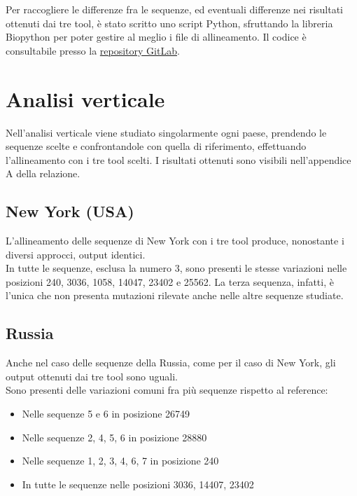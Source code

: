 \documentclass[a4paper,10pt]{article}
\begin{document}
Per raccogliere le differenze fra le sequenze, ed eventuali differenze nei risultati ottenuti dai tre tool, è stato scritto uno script Python, sfruttando la libreria Biopython per poter gestire al meglio i file di allineamento. Il codice è consultabile presso la \textcolor{blue}{\href{https://gitlab.com/i.bettini/bioinformatic}{repository GitLab}}.

\section{Analisi verticale}
Nell'analisi verticale viene studiato singolarmente ogni paese, prendendo le sequenze scelte e confrontandole con quella di riferimento, effettuando l'allineamento con i tre tool scelti. I risultati ottenuti sono visibili nell'appendice A della relazione.

\subsection{New York (USA)}
L'allineamento delle sequenze di New York con i tre tool produce, nonostante i diversi approcci, output identici.\\ 

In tutte le sequenze, esclusa la numero 3, sono presenti le stesse variazioni nelle posizioni 240, 3036, 1058, 14047, 23402 e 25562.
La terza sequenza, infatti, è l'unica che non presenta mutazioni rilevate anche nelle altre sequenze studiate.

\subsection{Russia}
Anche nel caso delle sequenze della Russia, come per il caso di New York, gli output ottenuti dai tre tool sono uguali.\\
Sono presenti delle variazioni comuni fra più sequenze rispetto al reference:
\begin{itemize}
\item Nelle sequenze 5 e 6 in posizione 26749
\item Nelle sequenze 2, 4, 5, 6 in posizione 28880
\item Nelle sequenze 1, 2, 3, 4, 6, 7 in posizione 240
\item In tutte le sequenze nelle posizioni 3036, 14407, 23402
\end{itemize}
\end{document}
